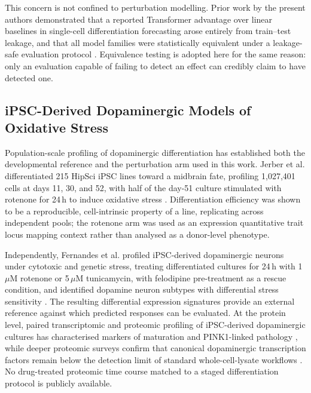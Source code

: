 \documentclass[5p,times,twocolumn]{elsarticle}
\begin{document}
This concern is not confined to perturbation modelling. Prior work by the present
authors demonstrated that a reported Transformer advantage over linear baselines
in single-cell differentiation forecasting arose entirely from train--test
leakage, and that all model families were statistically equivalent under a
leakage-safe evaluation protocol \cite{kanu2026leakage}. Equivalence testing
\cite{lakens2017equivalence} is adopted here for the same reason: only an
evaluation capable of failing to detect an effect can credibly claim to have
detected one.

\subsection{\textbf{iPSC-Derived Dopaminergic Models of Oxidative Stress}}

Population-scale profiling of dopaminergic differentiation has established both
the developmental reference and the perturbation arm used in this work. Jerber
et al. differentiated 215 HipSci iPSC lines toward a midbrain fate, profiling
1{,}027{,}401 cells at days 11, 30, and 52, with half of the day-51 culture
stimulated with rotenone for 24\,h to induce oxidative stress
\cite{jerber2021population}. Differentiation efficiency was shown to be a
reproducible, cell-intrinsic property of a line, replicating across independent
pools; the rotenone arm was used as an expression quantitative trait locus
mapping context rather than analysed as a donor-level phenotype.

Independently, Fernandes et al. profiled iPSC-derived dopaminergic neurons under
cytotoxic and genetic stress, treating differentiated cultures for 24\,h with
1\,$\mu$M rotenone or 5\,$\mu$M tunicamycin, with felodipine pre-treatment as a
rescue condition, and identified dopamine neuron subtypes with differential
stress sensitivity \cite{fernandes2020single}. The resulting differential
expression signatures provide an external reference against which predicted
responses can be evaluated. At the protein level, paired transcriptomic and
proteomic profiling of iPSC-derived dopaminergic cultures has characterised
markers of maturation and PINK1-linked pathology \cite{novak2022single}, while
deeper proteomic surveys confirm that canonical dopaminergic transcription
factors remain below the detection limit of standard whole-cell-lysate workflows
\cite{cavarischia2024proteome}. No drug-treated proteomic time course matched to
a staged differentiation protocol is publicly available.
\end{document}
